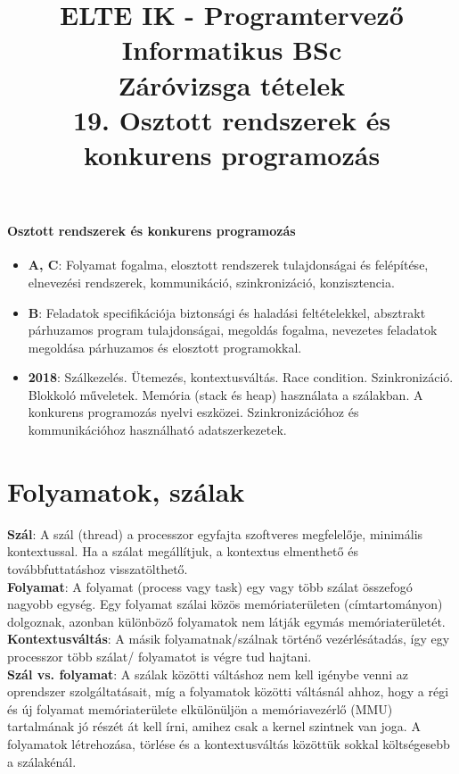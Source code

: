 \documentclass[margin=0px]{article}
\title{\textbf{{\Large ELTE IK - Programtervező Informatikus BSc} \vspace{0.2cm} \\ {\huge Záróvizsga tételek}} \vspace{0.3cm} \\ 19. Osztott rendszerek és konkurens programozás}
\author{}
\date{}
\newenvironment{tetel}[1]{\paragraph{#1}}{}
\begin{document}
\maketitle

\begin{tetel}{Osztott rendszerek és konkurens programozás}
    \begin{itemize}
        \item[] \textbf{A, C}: Folyamat fogalma, elosztott rendszerek tulajdonságai és felépítése, elnevezési rendszerek, kommunikáció, szinkronizáció, konzisztencia.
        \item[] \textbf{B}: Feladatok specifikációja biztonsági és haladási feltételekkel, absztrakt párhuzamos program tulajdonságai, megoldás fogalma, nevezetes feladatok megoldása párhuzamos és elosztott programokkal.
        \item[] \textbf{2018}: Szálkezelés. Ütemezés, kontextusváltás. Race condition. Szinkronizáció. Blokkoló műveletek. Memória (stack és heap) használata a szálakban. A konkurens programozás nyelvi eszközei. Szinkronizációhoz és kommunikációhoz használható adatszerkezetek.
    \end{itemize}
\end{tetel}

\section{Folyamatok, szálak}

\noindent \textbf{Szál}: A szál (thread) a processzor egyfajta szoftveres megfelelője, minimális kontextussal. Ha a szálat
megállítjuk, a kontextus elmenthető és továbbfuttatáshoz visszatölthető.\\

\noindent \textbf{Folyamat}: A folyamat (process vagy task) egy vagy több szálat összefogó nagyobb egység. Egy folyamat
szálai közös memóriaterületen (címtartományon) dolgoznak, azonban különböző folyamatok nem látják egymás memóriaterületét.\\

\noindent \textbf{Kontextusváltás}: A másik folyamatnak/szálnak történő vezérlésátadás, így egy processzor több szálat/ folyamatot
is végre tud hajtani.\\

\noindent \textbf{Szál vs. folyamat}: A szálak közötti váltáshoz nem kell igénybe venni az oprendszer szolgáltatásait, míg
a folyamatok közötti váltásnál ahhoz, hogy a régi és új folyamat memóriaterülete elkülönüljön a memóriavezérlő (MMU)
tartalmának jó részét át kell írni, amihez csak a kernel szintnek van joga. A folyamatok létrehozása, törlése és a kontextusváltás
közöttük sokkal költségesebb a szálakénál.
\end{document}
